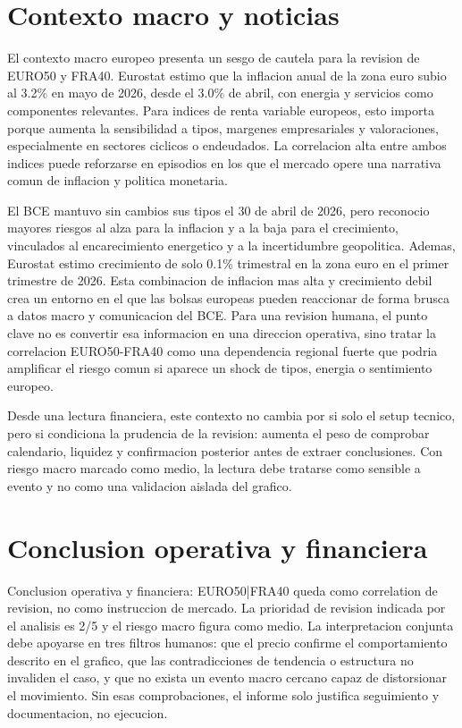 \documentclass[11pt,a4paper]{article}
\begin{document}
\section*{Contexto macro y noticias}
El contexto macro europeo presenta un sesgo de cautela para la revision de EURO50 y FRA40. Eurostat estimo que la inflacion anual de la zona euro subio al 3.2\% en mayo de 2026, desde el 3.0\% de abril, con energia y servicios como componentes relevantes. Para indices de renta variable europeos, esto importa porque aumenta la sensibilidad a tipos, margenes empresariales y valoraciones, especialmente en sectores ciclicos o endeudados. La correlacion alta entre ambos indices puede reforzarse en episodios en los que el mercado opere una narrativa comun de inflacion y politica monetaria.

El BCE mantuvo sin cambios sus tipos el 30 de abril de 2026, pero reconocio mayores riesgos al alza para la inflacion y a la baja para el crecimiento, vinculados al encarecimiento energetico y a la incertidumbre geopolitica. Ademas, Eurostat estimo crecimiento de solo 0.1\% trimestral en la zona euro en el primer trimestre de 2026. Esta combinacion de inflacion mas alta y crecimiento debil crea un entorno en el que las bolsas europeas pueden reaccionar de forma brusca a datos macro y comunicacion del BCE. Para una revision humana, el punto clave no es convertir esa informacion en una direccion operativa, sino tratar la correlacion EURO50-FRA40 como una dependencia regional fuerte que podria amplificar el riesgo comun si aparece un shock de tipos, energia o sentimiento europeo.

Desde una lectura financiera, este contexto no cambia por si solo el setup tecnico, pero si condiciona la prudencia de la revision: aumenta el peso de comprobar calendario, liquidez y confirmacion posterior antes de extraer conclusiones. Con riesgo macro marcado como medio, la lectura debe tratarse como sensible a evento y no como una validacion aislada del grafico.

\section*{Conclusion operativa y financiera}
Conclusion operativa y financiera: EURO50|FRA40 queda como correlation de revision, no como instruccion de mercado. La prioridad de revision indicada por el analisis es 2/5 y el riesgo macro figura como medio. La interpretacion conjunta debe apoyarse en tres filtros humanos: que el precio confirme el comportamiento descrito en el grafico, que las contradicciones de tendencia o estructura no invaliden el caso, y que no exista un evento macro cercano capaz de distorsionar el movimiento. Sin esas comprobaciones, el informe solo justifica seguimiento y documentacion, no ejecucion.
\end{document}
